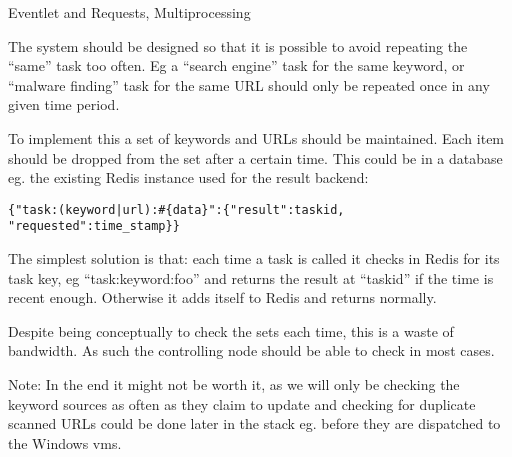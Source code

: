 Eventlet and Requests, Multiprocessing






The system should be designed so that it is possible to avoid repeating the ``same'' task too often. Eg a ``search engine'' task for the same keyword, or ``malware finding'' task for the same URL should only be repeated once in any given time period.

To implement this a set of keywords and URLs should be maintained. Each item should be dropped from the set after a certain time. This could be in a database eg. the existing Redis instance used for the result backend:

\verb/{"task:(keyword|url):#{data}":{"result":taskid, "requested":time_stamp}}/

The simplest solution is that: each time a task is called it checks in Redis for its task key, eg ``task:keyword:foo'' and returns the result at ``taskid'' if the time is recent enough. Otherwise it adds itself to Redis and returns normally.

Despite being conceptually to check the sets each time, this is a waste of bandwidth. As such the controlling node should be able to check in most cases.

Note: In the end it might not be worth it, as we will only be checking the keyword sources as often as they claim to update and checking for duplicate scanned URLs could be done later in the stack eg. before they are dispatched to the Windows vms.